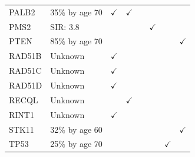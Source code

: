 \documentclass[
  11pt,
]{env/yjiao}
\begin{document}
\begin{landscape}
\begin{table}
\begin{tabular}[t]{llllllll}
\rowcolor{gray!6}  PALB2 & 35\% by age 70 & \(\checkmark\) & \(\checkmark\) &  &  &  & \\
PMS2 & SIR: 3.8 &  &  &  & \(\checkmark\) &  & \\
\rowcolor{gray!6}  PTEN & 85\% by age 70 &  &  &  &  &  & \(\checkmark\)\\
RAD51B & Unknown & \(\checkmark\) &  &  &  &  & \\
\addlinespace
\rowcolor{gray!6}  RAD51C & Unknown & \(\checkmark\) &  &  &  &  & \\
RAD51D & Unknown & \(\checkmark\) &  &  &  &  & \\
\rowcolor{gray!6}  RECQL & Unknown &  & \(\checkmark\) &  &  &  & \\
RINT1 & Unknown & \(\checkmark\) &  &  &  &  & \\
\rowcolor{gray!6}  STK11 & 32\% by age 60 &  &  &  &  &  & \(\checkmark\)\\
\addlinespace
TP53 & 25\% by age 70 &  &  &  &  & \(\checkmark\) & \\
\bottomrule
\end{tabular}
\end{table}
\end{landscape}
\end{document}
